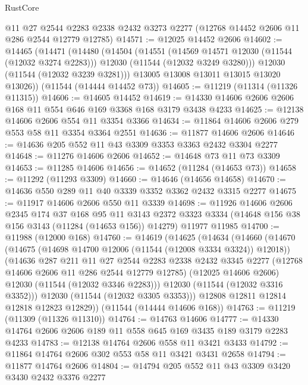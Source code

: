 \begin{lexlean}{RustCore}
\begin{coremodule}
    @11
    @27
    @2544
    @2283
    @2338
    @2432
    @3273
    @2277
    (@12768 @14452 @2606 @11 @286 @2544 @12779 @12785)
@14571 := @12025 @14452 @2606
@14602 := @14465
    (@14471
      (@14480
        (@14504
          (@14551
            (@14569 @14571 @12030 (@11544 (@12032 @3274 @2283)))
            @12030
            (@11544 (@12032 @3249 @3280)))
          @12030
          (@11544 (@12032 @3239 @3281)))
        @13005
        @13008
        @13011
        @13015
        @13020
        @13026))
    (@11544 (@14444 @14452 @73))
@14605 := @11219 (@11314 (@11326 @11315))
@14606 := @14605 @14452
@14619 := @14330 @14606 @2606 @2606 @168 @11 @554 @646 @169 @3368 @168 @3179 @3438 @4233
@14625 := @12138 @14606 @2606 @554 @11 @3354 @3366
@14634 := @11864 @14606 @2606 @279 @553 @58 @11 @3354 @3364 @2551
@14636 := @11877 @14606 @2606
@14646 := @14636 @205 @552 @11 @43 @3309 @3353 @3363 @2432 @3304 @2277
@14648 := @11276 @14606 @2606
@14652 := @14648 @73 @11 @73 @3309
@14653 := @11285 @14606
@14656 := @14652 (@11284 (@14653 @73))
@14658 := @11292 (@11293 @3309)
@14660 := @14646 (@14656 @14658)
@14670 := @14636 @550 @289 @11 @40 @3339 @3352 @3362 @2432 @3315 @2277
@14675 := @11917 @14606 @2606 @550 @11 @3339
@14698 := @11926
    @14606
    @2606
    @2345
    @174
    @37
    @168
    @95
    @11
    @3143
    @2372
    @3323
    @3334
    (@14648 @156 @38 @156 @3143 (@11284 (@14653 @156)) @14279)
    @11977
    @11985
@14700 := @11988 (@12000 @168)
@14760 := @14619
    (@14625
      (@14634
        (@14660
          (@14670
            (@14675 (@14698 @14700 @12006 (@11544 (@12008 @3334 @3324)) @12018))
            (@14636
              @287
              @211
              @11
              @27
              @2544
              @2283
              @2338
              @2432
              @3345
              @2277
              (@12768 @14606 @2606 @11 @286 @2544 @12779 @12785)
              (@12025 @14606 @2606)
              @12030
              (@11544 (@12032 @3346 @2283)))
            @12030
            (@11544 (@12032 @3316 @3352)))
          @12030
          (@11544 (@12032 @3305 @3353)))
        @12808
        @12811
        @12814
        @12818
        @12823
        @12829))
    (@11544 (@14444 @14606 @168))
@14763 := @11219 (@11309 (@11326 @11310))
@14764 := @14763 @14606
@14777 := @14330 @14764 @2606 @2606 @189 @11 @558 @645 @169 @3435 @189 @3179 @2283 @4233
@14783 := @12138 @14764 @2606 @558 @11 @3421 @3433
@14792 := @11864 @14764 @2606 @302 @553 @58 @11 @3421 @3431 @2658
@14794 := @11877 @14764 @2606
@14804 := @14794 @205 @552 @11 @43 @3309 @3420 @3430 @2432 @3376 @2277

\end{coremodule}
\end{lexlean}
